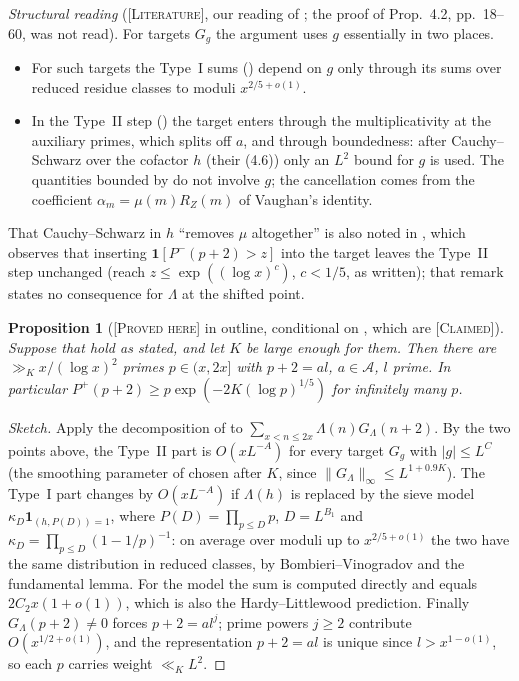 \documentclass[11pt]{amsart}
\newtheorem{proposition}[theorem]{Proposition}
\theoremstyle{definition}
\theoremstyle{remark}
\newcommand{\lbl}[1]{\textup{\textsc{[#1]}}}
\begin{document}
\emph{Structural reading} (\lbl{Literature}, our reading of \cite[Prop.~2.1,
Sections~3 and~4.1, (5.1), Prop.~5.3 and Section~5.3]{LWW26}; the proof of
Prop.~4.2, pp.~18--60, was not read). For targets $G_g$ the argument uses $g$
essentially in two places.
\begin{itemize}
\item For such targets the Type~I sums (\cite[Section~3]{LWW26}) depend on $g$
  only through its sums over reduced residue classes to moduli $x^{2/5+o(1)}$.
\item In the Type~II step (\cite[Section~4.1]{LWW26}) the target enters through
  the multiplicativity at the auxiliary primes, which splits off $a$, and
  through boundedness: after Cauchy--Schwarz over the cofactor $h$ (their
  (4.6)) only an $L^2$ bound for $g$ is used. The quantities bounded by
  \cite[Props.~4.2 and 5.3]{LWW26} do not involve $g$; the cancellation comes
  from the coefficient $\alpha_m=\mu(m)R_Z(m)$ of Vaughan's identity.
\end{itemize}
That Cauchy--Schwarz in $h$ ``removes $\mu$ altogether'' is also noted in
\cite[Remark~6.17]{Wan26}, which observes that inserting
$\mathbf 1[P^-(p+2)>z]$ into the target leaves the Type~II step unchanged
(reach $z\le\exp((\log x)^c)$, $c<1/5$, as written); that remark states no
consequence for $\Lambda$ at the shifted point.

\begin{proposition}[\lbl{Proved here} in outline, conditional on {\cite[Props.~4.2 and 5.3]{LWW26}}, which are \lbl{Claimed}]\label{prop:lww-transfer}
Suppose that \cite[Props.~4.2 and 5.3]{LWW26} hold as stated, and let $K$ be
large enough for them. Then there are $\gg_K x/(\log x)^2$ primes $p\in(x,2x]$
with $p+2=al$, $a\in\mathcal A$, $l$ prime. In particular
$P^+(p+2)\ge p\exp(-2K(\log p)^{1/5})$ for infinitely many $p$.
\end{proposition}

\begin{proof}[Sketch]
Apply the decomposition of \cite[Prop.~2.1]{LWW26} to
$\sum_{x<n\le2x}\Lambda(n)G_\Lambda(n+2)$. By the two points above, the Type~II
part is $O(xL^{-A})$ for every target $G_g$ with $|g|\le L^C$ (the smoothing
parameter of \cite[p.~15]{LWW26} chosen after $K$, since
$\|G_\Lambda\|_\infty\le L^{1+0.9K}$). The Type~I part changes by $O(xL^{-A})$
if $\Lambda(h)$ is replaced by the sieve model $\kappa_D\mathbf 1_{(h,P(D))=1}$,
where $P(D)=\prod_{p\le D}p$, $D=L^{B_1}$ and $\kappa_D=\prod_{p\le D}(1-1/p)^{-1}$:
on average over moduli up to $x^{2/5+o(1)}$ the two have the same distribution in
reduced classes, by Bombieri--Vinogradov and the fundamental lemma. For the
model the sum is computed directly and equals $2C_2x(1+o(1))$, which is also the
Hardy--Littlewood prediction. Finally $G_\Lambda(p+2)\ne0$ forces $p+2=al^j$;
prime powers $j\ge2$ contribute $O(x^{1/2+o(1)})$, and the representation
$p+2=al$ is unique since $l>x^{1-o(1)}$, so each $p$ carries weight $\ll_KL^2$.
\end{proof}
\end{document}
